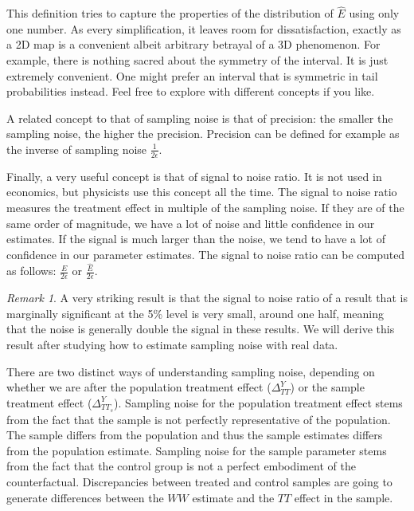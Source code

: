 \documentclass[
]{book}
\theoremstyle{definition}
\theoremstyle{definition}
\theoremstyle{definition}
\theoremstyle{definition}
\theoremstyle{remark}
\newtheorem*{remark}{Remark}
\begin{document}
This definition tries to capture the properties of the distribution of \(\hat{E}\) using only one number.
As every simplification, it leaves room for dissatisfaction, exactly as a 2D map is a convenient albeit arbitrary betrayal of a 3D phenomenon.
For example, there is nothing sacred about the symmetry of the interval.
It is just extremely convenient.
One might prefer an interval that is symmetric in tail probabilities instead.
Feel free to explore with different concepts if you like.

A related concept to that of sampling noise is that of precision: the smaller the sampling noise, the higher the precision.
Precision can be defined for example as the inverse of sampling noise \(\frac{1}{2\epsilon}\).

Finally, a very useful concept is that of signal to noise ratio.
It is not used in economics, but physicists use this concept all the time.
The signal to noise ratio measures the treatment effect in multiple of the sampling noise.
If they are of the same order of magnitude, we have a lot of noise and little confidence in our estimates.
If the signal is much larger than the noise, we tend to have a lot of confidence in our parameter estimates.
The signal to noise ratio can be computed as follows: \(\frac{E}{2\epsilon}\) or \(\frac{\hat{E}}{2\epsilon}\).

\begin{remark}
\iffalse{} {Remark. } \fi{}A very striking result is that the signal to noise ratio of a result that is marginally significant at the 5\% level is very small, around one half, meaning that the noise is generally double the signal in these results.
We will derive this result after studying how to estimate sampling noise with real data.
\end{remark}

There are two distinct ways of understanding sampling noise, depending on whether we are after the population treatment effect (\(\Delta^Y_{TT}\)) or the sample treatment effect (\(\Delta^Y_{TT_s}\)).
Sampling noise for the population treatment effect stems from the fact that the sample is not perfectly representative of the population.
The sample differs from the population and thus the sample estimates differs from the population estimate.
Sampling noise for the sample parameter stems from the fact that the control group is not a perfect embodiment of the counterfactual.
Discrepancies between treated and control samples are going to generate differences between the \(WW\) estimate and the \(TT\) effect in the sample.
\end{document}
